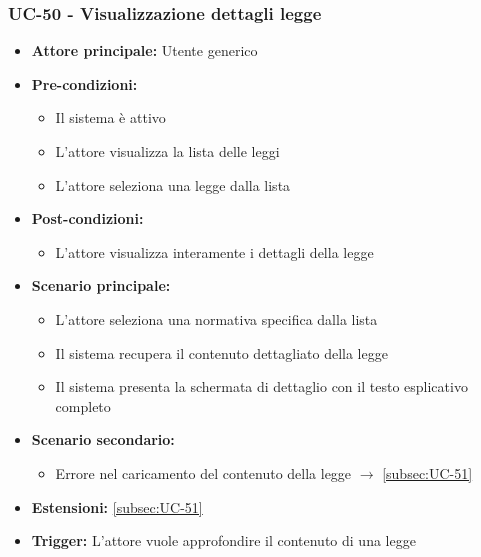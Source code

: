 \documentclass[a4paper,12pt]{article}
\begin{document}
\subsubsection{UC-50 - Visualizzazione dettagli legge} \label{sec:UC-50}
\begin{itemize}
    \item \textbf{Attore principale:} Utente generico
    \item \textbf{Pre-condizioni:}
    \begin{itemize}
        \item Il sistema è attivo
        \item L'attore visualizza la lista delle leggi
        \item L'attore seleziona una legge dalla lista
    \end{itemize}
    \item \textbf{Post-condizioni:}
    \begin{itemize}
        \item L'attore visualizza interamente i dettagli della legge
    \end{itemize}
    \item \textbf{Scenario principale:} 
    \begin{itemize}
        \item L'attore seleziona una normativa specifica dalla lista
        \item Il sistema recupera il contenuto dettagliato della legge
        \item Il sistema presenta la schermata di dettaglio con il testo esplicativo completo
    \end{itemize}
    \item \textbf{Scenario secondario:} 
    \begin{itemize}
         \item Errore nel caricamento del contenuto della legge $\rightarrow$ \ref{subsec:UC-51}
    \end{itemize}
    \item \textbf{Estensioni:} \ref{subsec:UC-51}
    \item \textbf{Trigger:} L'attore vuole approfondire il contenuto di una legge
\end{itemize}
\end{document}

